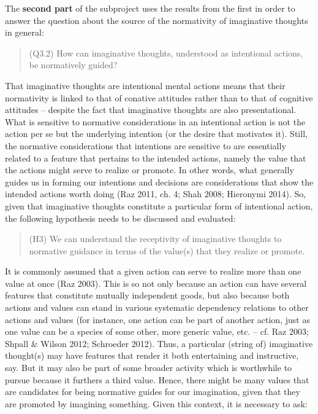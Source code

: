 The \textbf{second part} of the subproject uses the results from the first in order to answer the question about the source of the normativity of imaginative thoughts in general:

\vspace{-.2cm}
\begin{quote}
(Q3.2) How can imaginative thoughts, understood as intentional actions, be normatively guided?
\end{quote}
\vspace{-.2cm}

\noindent That imaginative thoughts are intentional mental actions means that their normativity is linked to that of conative attitudes rather than to that of cognitive attitudes -- despite the fact that imaginative thoughts are also presentational. What is sensitive to normative considerations in an intentional action is not the action per se but the underlying intention (or the desire that motivates it). Still, the normative considerations that intentions are sensitive to are essentially related to a feature that pertains to the intended actions, namely the value that the actions might serve to realize or promote. In other words, what generally guides us in forming our intentions and decisions are considerations that show the intended actions worth doing (Raz 2011, ch. 4; Shah 2008; Hieronymi 2014). So, given that imaginative thoughts constitute a particular form of intentional action, the following hypothesis needs to be discussed and evaluated:

\vspace{-.2cm}
\begin{quote}
(H3) We can understand the receptivity of imaginative thoughts to normative guidance in terms of the value(s) that they realize or promote.
\end{quote}
\vspace{-.2cm}

\noindent It is commonly assumed that a given action can serve to realize more than one value at once (Raz 2003). This is so not only because an action can have several features that constitute mutually independent goods, but also because both actions and values can stand in various systematic dependency relations to other actions and values (for instance, one action can be part of another action, just as one value can be a species of some other, more generic value, etc. -- cf. Raz 2003; Shpall \& Wilson 2012; Schroeder 2012). Thus, a particular (string of) imaginative thought(s) may have features that render it both entertaining and instructive, say. But it may also be part of some broader activity which is worthwhile to pursue because it furthers a third value. Hence, there might be many values that are candidates for being normative guides for our imagination, given that they are promoted by imagining something. Given this context, it is necessary to ask:


